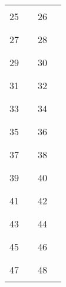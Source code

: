 \begin{center}
	
\begin{tabular}{l l l l }
	25 & \rule{1.75in}{.2pt} & 26 & \rule{1.75in}{.2pt} \vspace{.225in} \\
	27 & \rule{1.75in}{.2pt} & 28 & \rule{1.75in}{.2pt} \vspace{.225in} \\
	29 & \rule{1.75in}{.2pt} & 30 & \rule{1.75in}{.2pt} \vspace{.225in} \\
	31 & \rule{1.75in}{.2pt} & 32 & \rule{1.75in}{.2pt} \vspace{.225in} \\
	33 & \rule{1.75in}{.2pt} & 34 & \rule{1.75in}{.2pt} \vspace{.225in} \\
	35 & \rule{1.75in}{.2pt} & 36 & \rule{1.75in}{.2pt} \vspace{.225in} \\
	37 & \rule{1.75in}{.2pt} & 38 & \rule{1.75in}{.2pt} \vspace{.225in} \\
	39 & \rule{1.75in}{.2pt} & 40 & \rule{1.75in}{.2pt} \vspace{.225in} \\
	41 & \rule{1.75in}{.2pt} & 42 & \rule{1.75in}{.2pt} \vspace{.225in} \\
	43 & \rule{1.75in}{.2pt} & 44 & \rule{1.75in}{.2pt} \vspace{.225in} \\
	45 & \rule{1.75in}{.2pt} & 46 & \rule{1.75in}{.2pt} \vspace{.225in} \\
	47 & \rule{1.75in}{.2pt} & 48 & \rule{1.75in}{.2pt} \vspace{.225in} \\
\end{tabular}
	
\end{center}
